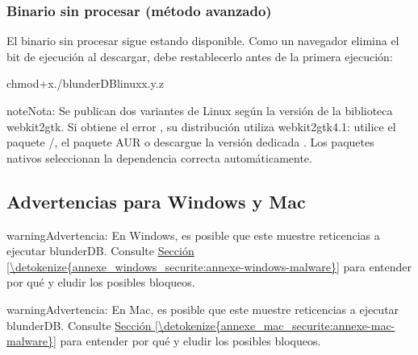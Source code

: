 \documentclass[letterpaper,10pt,spanish]{sphinxmanual}
\begin{document}
\subsubsection{Binario sin procesar (método avanzado)}
\label{\detokenize{telecharge_install:binaire-brut-methode-avancee}}
\sphinxAtStartPar
El binario sin procesar  sigue estando disponible. Como un navegador elimina el bit de ejecución al descargar, debe restablecerlo antes de la primera ejecución:

\begin{sphinxVerbatim}[commandchars=\\\{\}]
chmod+x./blunderDB\PYGZhy{}linux\PYGZhy{}x.y.z
\end{sphinxVerbatim}

\begin{sphinxadmonition}{note}{Nota:}
\sphinxAtStartPar
Se publican dos variantes de Linux según la versión de la biblioteca webkit2gtk. Si obtiene el error , su distribución utiliza webkit2gtk\sphinxhyphen{}4.1: utilice el paquete /, el paquete AUR o descargue la versión dedicada . Los paquetes nativos seleccionan la dependencia correcta automáticamente.
\end{sphinxadmonition}


\subsection{Advertencias para Windows y Mac}
\label{\detokenize{telecharge_install:avertissements-windows-et-mac}}
\begin{sphinxadmonition}{warning}{Advertencia:}
\sphinxAtStartPar
En Windows, es posible que este muestre reticencias a ejecutar blunderDB. Consulte \hyperref[\detokenize{annexe_windows_securite:annexe-windows-malware}]{Sección \ref{\detokenize{annexe_windows_securite:annexe-windows-malware}}} para entender por qué y eludir los posibles bloqueos.
\end{sphinxadmonition}

\begin{sphinxadmonition}{warning}{Advertencia:}
\sphinxAtStartPar
En Mac, es posible que este muestre reticencias a ejecutar blunderDB. Consulte \hyperref[\detokenize{annexe_mac_securite:annexe-mac-malware}]{Sección \ref{\detokenize{annexe_mac_securite:annexe-mac-malware}}} para entender por qué y eludir los posibles bloqueos.
\end{sphinxadmonition}
\end{document}
